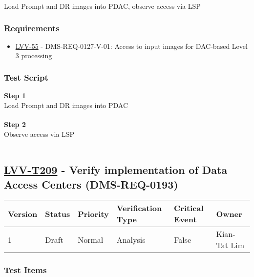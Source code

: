 Load Prompt and DR images into PDAC, observe access via LSP

\hypertarget{requirements-108}{%
\subsubsection{Requirements}\label{requirements-108}}

\begin{itemize}
\tightlist
\item
  \href{https://jira.lsstcorp.org/browse/LVV-55}{LVV-55} -
  DMS-REQ-0127-V-01: Access to input images for DAC-based Level 3
  processing
\end{itemize}

\hypertarget{test-script-108}{%
\subsubsection{Test Script}\label{test-script-108}}

\textbf{Step 1}\\
Load Prompt and DR images into PDAC\\
~\\
\textbf{Step 2}\\
Observe access via LSP\\
~\\

\hypertarget{lvv-t209---verify-implementation-of-data-access-centers-dms-req-0193}{%
\subsection{\texorpdfstring{\href{https://jira.lsstcorp.org/secure/Tests.jspa\#/testCase/LVV-T209}{LVV-T209}
- Verify implementation of Data Access Centers
(DMS-REQ-0193)}{LVV-T209 - Verify implementation of Data Access Centers (DMS-REQ-0193)}}\label{lvv-t209---verify-implementation-of-data-access-centers-dms-req-0193}}

\begin{longtable}[]{@{}llllll@{}}
\toprule
Version & Status & Priority & Verification Type & Critical Event &
Owner\tabularnewline
\midrule
\endhead
1 & Draft & Normal & Analysis & False & Kian-Tat Lim\tabularnewline
\bottomrule
\end{longtable}

\hypertarget{test-items-109}{%
\subsubsection{Test Items}\label{test-items-109}}

